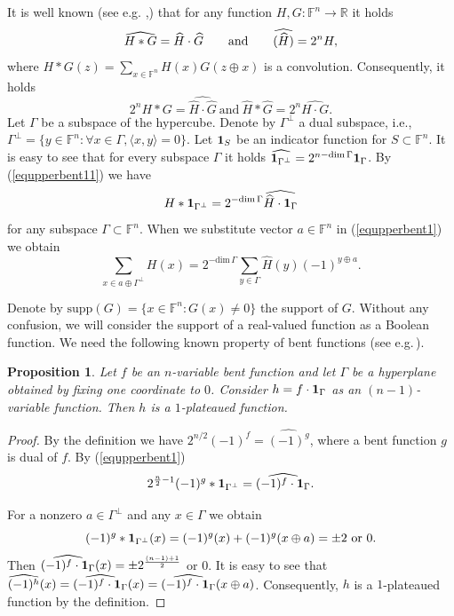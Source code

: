 \documentclass[a4paper,12pt]{article}   %
\newtheorem{proposition}{Proposition}
\begin{document}
It is well known (see e.g. \cite{Carlet},\cite{Tsf}) that for any
function $H,G:\mathbb{F}^n\rightarrow \mathbb{R}$ it holds
$$\widehat{H*G}= {\widehat{H}\cdot\widehat{ G}} \qquad {\rm
and}\qquad \widehat{(\widehat{H})}=2^nH,$$ where
$H*G(z)=\sum\limits_{x\in \mathbb{F}^n}H(x)G(z\oplus x)$ is a
convolution. Consequently, it holds
\begin{equation}\label{equpperbent11}
2^{n}H*G= \widehat{\widehat{H}\cdot\widehat{ G}} \ \mbox{and}\
\widehat{H}*\widehat{ G}= 2^{n}\widehat{H\cdot G}.
\end{equation}
 Let $\Gamma$ be a subspace of the hypercube.
 Denote by
   $\Gamma^\perp$  a
dual subspace, i.e., $\Gamma^\perp=\{y\in \mathbb{F}^n : \forall
x\in \Gamma, \langle x,y\rangle=0 \}.$ Let ${\bf1}_S$ be an
indicator function for $S\subset\mathbb{F}^n $. It is easy to see
that for every subspace $\Gamma$ it holds
$\widehat{{\bf1}_{\Gamma^\perp}}=2^{n-\mathrm{dim}\,\Gamma}{\bf1}_{\Gamma}$.
By (\ref{equpperbent11}) we have
\begin{equation}\label{equpperbent1}
{H}*{\bf1}_{\Gamma^\perp}=2^{-\mathrm{dim}\,\Gamma}\widehat{\widehat{H}\cdot\mathbf{1}_{\Gamma}}
\end{equation}
for any subspace  $\Gamma\subset \mathbb{F}^n$. When we substitute
vector $a\in \mathbb{F}^n$ in (\ref{equpperbent1}) we obtain
\begin{equation}\label{equpperbent10}
\sum\limits_{x\in a\oplus\Gamma^\perp}H(x)
=2^{-\mathrm{dim}\,\Gamma}{\sum\limits_{y\in
\Gamma}\widehat{H}(y)(-1)^{y\oplus a}}.
\end{equation}


Denote by $\mathrm{supp}(G)=\{x\in \mathbb{F}^n : G(x)\neq 0\}$ the
support of $G$. Without any confusion, we will consider the support
of a real-valued function as a Boolean function. We need the
following known property of bent functions (see e.g.\,\cite{Mes0}).

\begin{proposition}\label{bentpla1}
Let $f$ be an $n$-variable bent function and let $\Gamma$ be a
hyperplane obtained by fixing one coordinate to $0$. Consider
$h={f}\cdot{\bf1}_{\Gamma}$ as an $(n-1)$-variable function. Then
$h$ is a  $1$-plateaued function.
\end{proposition}
\begin{proof}
By the definition we have $2^{n/2}(-1)^f= \widehat{(-1)^g}$,  where
a bent function $g$ is  dual of $f$. By (\ref{equpperbent1})
$$2^{\frac{n}{2}-1}(-1)^g*{\bf1}_{\Gamma^\perp}=\widehat{(-1)^{f}\cdot{\bf1}_{\Gamma}}.$$

For a nonzero $a\in\Gamma^\perp$ and any $x\in \Gamma$ we obtain
$$(-1)^g*{\mathbf 1}_{\Gamma^\perp}(x)=(-1)^g(x)+(-1)^g(x\oplus a)=\pm 2\ {\rm
or }\ 0.$$ Then
$\widehat{(-1)^{f}\cdot{\bf1}_{\Gamma}}(x)=\pm2^{\frac{(n-1)+1}{2}}$
or $0$.  It is easy to see that
$\widehat{(-1)^h}(x)=\widehat{(-1)^{f}\cdot{\bf1}_{\Gamma}}(x)=\widehat{(-1)^{f}\cdot{\bf1}_{\Gamma}}(x\oplus
a)$. Consequently, $h$ is a $1$-plateaued function by the
definition.
\end{proof}
\end{document}
